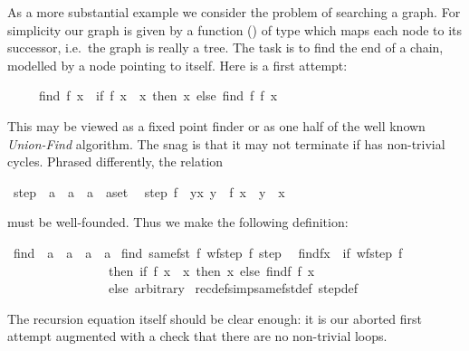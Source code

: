 \begin{isabellebody}
\begin{isamarkuptext}
As a more substantial example we consider the problem of searching a graph.
For simplicity our graph is given by a function () of
type  which
maps each node to its successor, i.e.\ the graph is really a tree.
The task is to find the end of a chain, modelled by a node pointing to
itself. Here is a first attempt:
\begin{isabelle}%
\ \ \ \ \ find\ {\isacharparenleft}f{\isacharcomma}\ x{\isacharparenright}\ {\isacharequal}\ {\isacharparenleft}if\ f\ x\ {\isacharequal}\ x\ then\ x\ else\ find\ {\isacharparenleft}f{\isacharcomma}\ f\ x{\isacharparenright}{\isacharparenright}%
\end{isabelle}
This may be viewed as a fixed point finder or as one half of the well known
\emph{Union-Find} algorithm.
The snag is that it may not terminate if  has non-trivial cycles.
Phrased differently, the relation%
\end{isamarkuptext}%
\ step{}\ {\isacharcolon}{\isacharcolon}\ {\isachardoublequote}{\isacharparenleft}{\isacharprime}a\ {\isasymRightarrow}\ {\isacharprime}a{\isacharparenright}\ {\isasymRightarrow}\ {\isacharparenleft}{\isacharprime}a\ {\isasymtimes}\ {\isacharprime}a{\isacharparenright}set{\isachardoublequote}\isanewline
\ \ {\isachardoublequote}step{}\ f\ {\isasymequiv}\ {\isacharbraceleft}{\isacharparenleft}y{\isacharcomma}x{\isacharparenright}{\isachardot}\ y\ {\isacharequal}\ f\ x\ {\isasymand}\ y\ {\isasymnoteq}\ x{\isacharbraceright}{\isachardoublequote}%
\begin{isamarkuptext}%
\noindent
must be well-founded. Thus we make the following definition:%
\end{isamarkuptext}%
\ find\ {\isacharcolon}{\isacharcolon}\ {\isachardoublequote}{\isacharparenleft}{\isacharprime}a\ {\isasymRightarrow}\ {\isacharprime}a{\isacharparenright}\ {\isasymtimes}\ {\isacharprime}a\ {\isasymRightarrow}\ {\isacharprime}a{\isachardoublequote}\isanewline
{}\ find\ {\isachardoublequote}same{\isacharunderscore}fst\ {\isacharparenleft}{\isasymlambda}f{\isachardot}\ wf{\isacharparenleft}step{}\ f{\isacharparenright}{\isacharparenright}\ step{}{\isachardoublequote}\isanewline
\ \ {\isachardoublequote}find{\isacharparenleft}f{\isacharcomma}x{\isacharparenright}\ {\isacharequal}\ {\isacharparenleft}if\ wf{\isacharparenleft}step{}\ f{\isacharparenright}\isanewline
\ \ \ \ \ \ \ \ \ \ \ \ \ \ \ \ then\ if\ f\ x\ {\isacharequal}\ x\ then\ x\ else\ find{\isacharparenleft}f{\isacharcomma}\ f\ x{\isacharparenright}\isanewline
\ \ \ \ \ \ \ \ \ \ \ \ \ \ \ \ else\ arbitrary{\isacharparenright}{\isachardoublequote}\isanewline
{\isacharparenleft}\ recdef{\isacharunderscore}simp{\isacharcolon}same{\isacharunderscore}fst{\isacharunderscore}def\ step{}{\isacharunderscore}def{\isacharparenright}%
\begin{isamarkuptext}%
\noindent
The recursion equation itself should be clear enough: it is our aborted
first attempt augmented with a check that there are no non-trivial loops.


\end{isamarkuptext}
\end{isabellebody}
